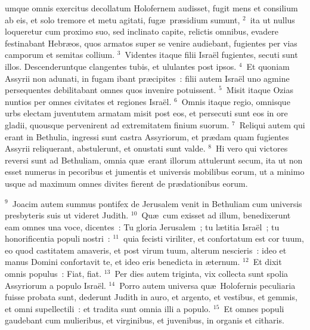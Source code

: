 \bchapter
{}umque omnis exercitus decollatum Holofernem audisset, fugit mens et consilium ab eis, et solo tremore et metu agitati, fug\ae\ pr\ae sidium sumunt,
${}^{2}$~ita ut nullus loqueretur cum proximo suo, sed inclinato capite, relictis omnibus, evadere festinabant Hebr\ae os, quos armatos super se venire audiebant, fugientes per vias camporum et semitas collium.
${}^{3}$~Videntes itaque filii Isra\"el fugientes, secuti sunt illos. Descenderuntque clangentes tubis, et ululantes post ipsos.
${}^{4}$~Et quoniam Assyrii non adunati, in fugam ibant pr\ae cipites~: filii autem Isra\"el uno agmine persequentes debilitabant omnes quos invenire potuissent.
${}^{5}$~Misit itaque Ozias nuntios per omnes civitates et regiones Isra\"el.
${}^{6}$~Omnis itaque regio, omnisque urbs electam juventutem armatam misit post eos, et persecuti sunt eos in ore gladii, quousque pervenirent ad extremitatem finium suorum.
${}^{7}$~Reliqui autem qui erant in Bethulia, ingressi sunt castra Assyriorum, et pr\ae dam quam fugientes Assyrii reliquerant, abstulerunt, et onustati sunt valde.
${}^{8}$~Hi vero qui victores reversi sunt ad Bethuliam, omnia qu\ae\ erant illorum attulerunt secum, ita ut non esset numerus in pecoribus et jumentis et universis mobilibus eorum, ut a minimo usque ad maximum omnes divites fierent de pr\ae dationibus eorum.


${}^{9}$~Joacim autem summus pontifex de Jerusalem venit in Bethuliam cum universis presbyteris suis ut videret Judith.
${}^{10}$~Qu\ae\ cum exisset ad illum, benedixerunt eam omnes una voce, dicentes~: Tu gloria Jerusalem~; tu l\ae titia Isra\"el~; tu honorificentia populi nostri~:
${}^{11}$~quia fecisti viriliter, et confortatum est cor tuum, eo quod castitatem amaveris, et post virum tuum, alterum nescieris~: ideo et manus Domini confortavit te, et ideo eris benedicta in \ae ternum.
${}^{12}$~Et dixit omnis populus~: Fiat, fiat.
${}^{13}$~Per dies autem triginta, vix collecta sunt spolia Assyriorum a populo Isra\"el.
${}^{14}$~Porro autem universa qu\ae\ Holofernis peculiaria fuisse probata sunt, dederunt Judith in auro, et argento, et vestibus, et gemmis, et omni supellectili~: et tradita sunt omnia illi a populo.
${}^{15}$~Et omnes populi gaudebant cum mulieribus, et virginibus, et juvenibus, in organis et citharis.

